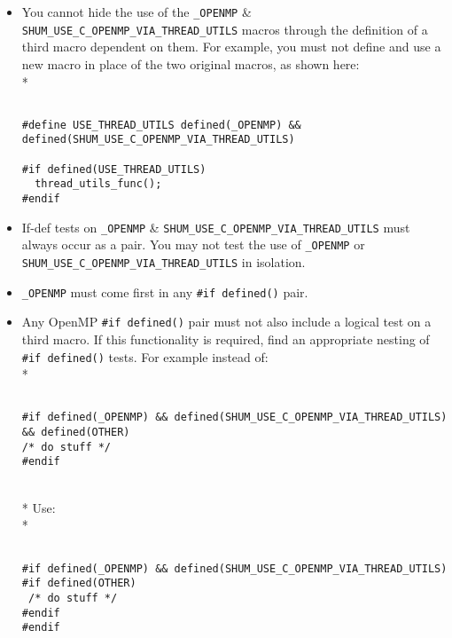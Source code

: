 \begin{itemize}

\item You cannot hide the use of the \verb|_OPENMP| \& \verb|SHUM_USE_C_OPENMP_VIA_THREAD_UTILS| macros through the definition of a third macro dependent on them.
      For example, you must not define and use a new macro in place of the two original macros, as shown here:\\*
      \begin{minipage}{\linewidth}
      \begin{verbatim}

#define USE_THREAD_UTILS defined(_OPENMP) && defined(SHUM_USE_C_OPENMP_VIA_THREAD_UTILS)

#if defined(USE_THREAD_UTILS)
  thread_utils_func();
#endif

      \end{verbatim}
      \end{minipage}

\item If-def tests on \verb|_OPENMP| \& \verb|SHUM_USE_C_OPENMP_VIA_THREAD_UTILS| must always occur as a pair.
      You may not test the use of \verb|_OPENMP| or \verb|SHUM_USE_C_OPENMP_VIA_THREAD_UTILS| in isolation.

\item \verb|_OPENMP| must come first in any \verb|#if defined()| pair.

\item Any OpenMP \verb|#if defined()| pair must not also include a logical test on a third macro. If this functionality is required, find an appropriate nesting of \verb|#if defined()| tests.
      For example instead of:\\*
      \begin{minipage}{\linewidth}
      \begin{verbatim}

#if defined(_OPENMP) && defined(SHUM_USE_C_OPENMP_VIA_THREAD_UTILS) && defined(OTHER)
/* do stuff */
#endif

      \end{verbatim}
      \end{minipage}\\*
      Use:\\*
      \begin{minipage}{\linewidth}
      \begin{verbatim}

#if defined(_OPENMP) && defined(SHUM_USE_C_OPENMP_VIA_THREAD_UTILS)
#if defined(OTHER)
 /* do stuff */
#endif
#endif


\end{verbatim}
\end{minipage}
\end{itemize}
